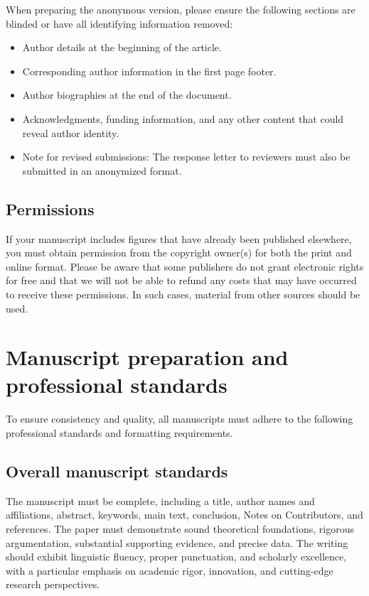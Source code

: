 \documentclass{jcd}
\theoremstyle{plain}
\theoremstyle{definition}
\begin{document}
When preparing the anonymous version, please ensure the following sections are blinded or have all identifying information removed:

\begin{itemize}
  \item Author details at the beginning of the article.
  \item Corresponding author information in the first page footer.
  \item Author biographies at the end of the document.
  \item Acknowledgments, funding information, and any other content that could reveal author identity.
  \item Note for revised submissions: The response letter to reviewers must also be submitted in an anonymized format.
\end{itemize}

\subsection{Permissions}

If your manuscript includes figures that have already been published elsewhere, you must obtain permission from the copyright owner(s) for both the print and online   format. Please be aware that some publishers do not grant electronic rights for free and that we will not be able to refund any costs that may have occurred to receive these permissions. In such cases, material from other sources should be used.

\section{Manuscript preparation and professional standards}

To ensure consistency and quality, all manuscripts must adhere to the following professional standards and formatting requirements.

\subsection{Overall manuscript standards}

The manuscript must be complete, including a title, author names and affiliations, abstract, keywords, main text, conclusion, Notes on Contributors, and references. The paper must demonstrate sound theoretical foundations, rigorous argumentation, substantial supporting evidence, and precise data. The writing should exhibit linguistic fluency, proper punctuation, and scholarly excellence, with a particular emphasis on academic rigor, innovation, and cutting-edge research perspectives.
\end{document}
